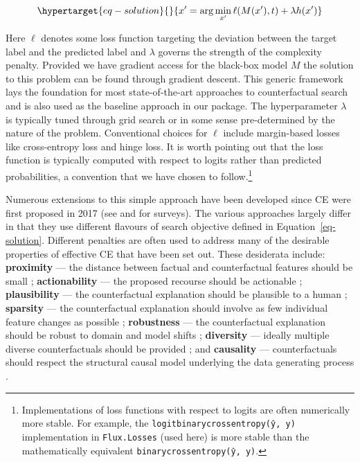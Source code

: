 \documentclass{juliacon}
\begin{document}
\begin{equation}\protect\hypertarget{eq-solution}{}{
x^\prime = \arg \min_{x^\prime}  \ell(M(x^\prime),t) + \lambda h(x^\prime)
}\label{eq-solution}\end{equation}

Here \(\ell\) denotes some loss function targeting the deviation between
the target label and the predicted label and \(\lambda\) governs the
strength of the complexity penalty. Provided we have gradient access for
the black-box model \(M\) the solution to this problem can be found
through gradient descent. This generic framework lays the foundation for
most state-of-the-art approaches to counterfactual search and is also
used as the baseline approach in our package. The hyperparameter
\(\lambda\) is typically tuned through grid search or in some sense
pre-determined by the nature of the problem. Conventional choices for
\(\ell\) include margin-based losses like cross-entropy loss and hinge
loss. It is worth pointing out that the loss function is typically
computed with respect to logits rather than predicted probabilities, a
convention that we have chosen to follow.\footnote{Implementations of
  loss functions with respect to logits are often numerically more
  stable. For example, the \texttt{logitbinarycrossentropy(ŷ,\ y)}
  implementation in \texttt{Flux.Losses} (used here) is more stable than
  the mathematically equivalent \texttt{binarycrossentropy(ŷ,\ y)}.}

Numerous extensions to this simple approach have been developed since CE
were first proposed in 2017 (see \textcite{verma2020counterfactual} and
\textcite{karimi2020survey} for surveys). The various approaches largely
differ in that they use different flavours of search objective defined
in Equation~\ref{eq-solution}. Different penalties are often used to
address many of the desirable properties of effective CE that have been
set out. These desiderata include: \textbf{proximity} --- the distance
between factual and counterfactual features should be small
\autocite{wachter2017counterfactual}; \textbf{actionability} --- the
proposed recourse should be actionable
\autocite{ustun2019actionable,poyiadzi2020face}; \textbf{plausibility}
--- the counterfactual explanation should be plausible to a human
\autocite{joshi2019realistic,schut2021generating}; \textbf{sparsity} ---
the counterfactual explanation should involve as few individual feature
changes as possible \autocite{schut2021generating}; \textbf{robustness}
--- the counterfactual explanation should be robust to domain and model
shifts \autocite{upadhyay2021robust}; \textbf{diversity} --- ideally
multiple diverse counterfactuals should be provided
\autocite{mothilal2020explaining}; and \textbf{causality} ---
counterfactuals should respect the structural causal model underlying
the data generating process
\autocite{karimi2020algorithmic,karimi2021algorithmic}.
\end{document}
